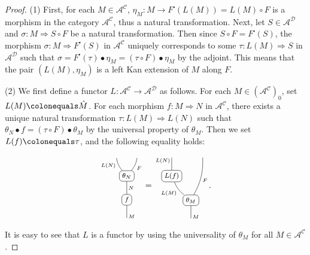 \documentclass{surv-l}
\numberwithin{equation}{chapter}
\numberwithin{figure}{chapter}
\theoremstyle{plain}
\theoremstyle{definition}
\theoremstyle{remark}
\newcommand{\RN}{\node[rounded corners, draw]}
\newcommand{\SL}[3]{\ar[from={#1}, to={#2}, dash, #3]}
\newcommand{\RB}[3]{\ar[from={#1}, to={#2}, dash, bend right=15, #3]}
\newcommand{\LB}[3]{\ar[from={#1}, to={#2}, dash, bend left=15, #3]}
\begin{document}
\begin{proof}
(1) First, for each $M \in \mathcal{A}^{{\mathcal{C}}}$, $\eta_M \colon M \to F^{\centerdot}(L(M)) = L(M)\circ F$
is a morphism in the category $\mathcal{A}^{{\mathcal{C}}}$, thus a natural transformation.
Next, let $S \in \mathcal{A}^{{\mathcal{D}}}$ and $\sigma \colon M \Rightarrow S \circ F$ be a natural transformation.
Then since $S \circ F =  F^{\centerdot}(S)$, the morphism $\sigma \colon M \Rightarrow F^{\centerdot}(S)$ in $\mathcal{A}^{{\mathcal{C}}}$
uniquely corresponds to some $\tau \colon L(M) \Rightarrow S$ in $\mathcal{A}^{{\mathcal{D}}}$
such that $\sigma = F^{\centerdot}(\tau) \bullet \eta_M = (\tau \circ F) \bullet \eta_M$ by the adjoint.
This means that the pair $(L(M), \eta_M)$ is a left Kan extension of $M$ along $F$.

(2) We first define a functor $L \colon \mathcal{A}^{{\mathcal{C}}} \to \mathcal{A}^{{\mathcal{D}}}$ as follows.
For each $M \in (\mathcal{A}^{{\mathcal{C}}})_0$, set $L(M)\colonequals  \hat{M}$.
For each morphism $f \colon M \Rightarrow N$ in $\mathcal{A}^{{\mathcal{C}}}$, there exists a unique natural transformation
$\tau \colon L(M) \Rightarrow L(N)$ such that $\theta_N \bullet f = (\tau \circ F)\bullet \theta_M$
by the universal property of $\theta_M$.
Then we set $L(f)\colonequals  \tau$, and the following equality holds:
\begin{equation}\label{eq:df-L}\footnotesize
\begin{tikzcd}[column sep=0.1em]
{}&&{}\\
&\RN(si) {\theta_N};&\\
&\RN(f) {f};&\\
&{}&
\RB{1-1}{si}{"L(N)"' near start}
\SL{si}{f}{"N"}
\RB{si}{1-3}{"F"'}
\SL{f}{4-2}{"M" very near end}
\end{tikzcd}
=
\begin{tikzcd}[column sep=0.1em]
{}&&{}\\
\RN(ta) {L(f)};&&\\
&\RN(th) {\theta_M};&\\
&{}&
\SL{1-1}{ta}{"L(N)"' near start}
\LB{th}{ta}{"L(M)"}
\SL{th}{4-2}{"M" very near end}
\RB{th}{1-3}{"F"'}
\end{tikzcd}.
\end{equation}
It is easy to see that $L$ is a functor by using the universality of $\theta_M$ for all $M \in \mathcal{A}^{{\mathcal{C}}}$.


\end{proof}
\end{document}
